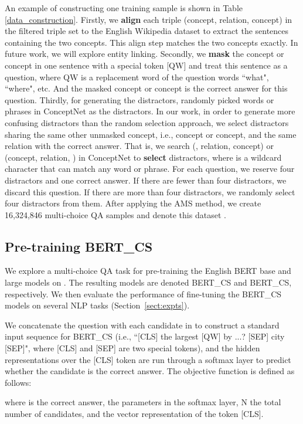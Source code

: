 \documentclass[11pt,a4paper]{article}
\begin{document}
An example of constructing one training sample is shown in Table \ref{data_construction}. Firstly, we \textbf{align} each triple (concept, relation, concept) in the filtered triple set to the English Wikipedia dataset to extract the sentences containing the two concepts. This align step matches the two concepts exactly. In future work, we will explore entity linking.
Secondly, we \textbf{mask} the concept or concept in one sentence with a special token [QW] and treat this sentence as a question, where QW is a replacement word of the question words ``what", ``where", etc.
And the masked concept or concept is the correct answer for this question.
Thirdly, for generating the distractors, \citet{sun2019probing} randomly picked words or phrases in ConceptNet as the distractors. In our work, in order to generate more confusing distractors than the random selection approach, we select distractors sharing the same other unmasked concept, i.e., concept or concept, and the same relation with the correct answer.
That is, we search (, relation, concept) or (concept, relation, ) in ConceptNet to \textbf{select} distractors, where  is a wildcard character that can match any word or phrase.
For each question, we reserve four distractors and one correct answer.
If there are fewer than four distractors, we discard this question.  If there are more than four distractors, we randomly select four distractors from them. After applying the AMS method, we create 16,324,846 multi-choice QA samples and denote this dataset .


\subsection{Pre-training BERT\_CS}
\label{sect:pre-training}
We explore a multi-choice QA task for pre-training the English BERT base and large models on . The resulting models are denoted BERT\_CS and BERT\_CS, respectively. 
We then evaluate the performance of fine-tuning the BERT\_CS models on several NLP tasks (Section~\ref{sect:expts}). 

We concatenate the question with each candidate in  to construct a standard input sequence for BERT\_CS (i.e., ``[CLS] the largest [QW] by ...? [SEP] city [SEP]", where [CLS] and [SEP] are two special tokens), and the hidden representations over the [CLS] token are run through a softmax layer to predict whether the candidate is the correct answer. The objective function is defined as follows:


where  is the correct answer,  the parameters in the softmax layer, N the total number of candidates, and  the vector representation of the token [CLS].
\end{document}
